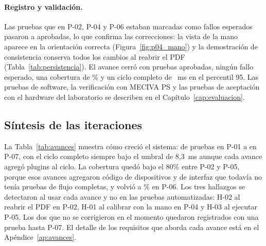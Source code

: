 \paragraph{Registro y validación.} Las pruebas que en P-02, P-04 y P-06 estaban marcadas como fallos esperados pasaron a aprobadas, lo que confirma las correcciones: la vista de la mano aparece en la orientación correcta (Figura~\ref{fig:p04_mano}) y la demostración de consistencia conserva todos los cambios al reabrir el PDF (Tabla~\ref{tab:persistencia}). El avance cerró con \PSietePruebas{} pruebas aprobadas, ningún fallo esperado, una cobertura de \PSieteCobertura\% y un ciclo completo de \PSieteCicloPnoventaycinco~ms en el percentil 95. Las pruebas de software, la verificación con MECIVA PS y las pruebas de aceptación con el hardware del laboratorio se describen en el Capítulo~\ref{cap:evaluacion}.

\subsection{Síntesis de las iteraciones}

La Tabla~\ref{tab:avances} muestra cómo creció el sistema: de \PUnoPruebas{} pruebas en P-01 a \PSietePruebas{} en P-07, con el ciclo completo siempre bajo el umbral de 8,3~ms aunque cada avance agregó plugins al ciclo. La cobertura quedó bajo el 80\% entre P-02 y P-05, porque esos avances agregaron código de dispositivos y de interfaz que todavía no tenía pruebas de flujo completas, y volvió a \PSeisCobertura\% en P-06. Los tres hallazgos se detectaron al usar cada avance y no en las pruebas automatizadas: H-02 al reabrir el PDF en P-02, H-01 al calibrar con la mano en P-04 y H-03 al ejecutar P-05. Los dos que no se corrigieron en el momento quedaron registrados con una prueba hasta P-07. El detalle de los requisitos que aborda cada avance está en el Apéndice~\ref{ap:avances}.
